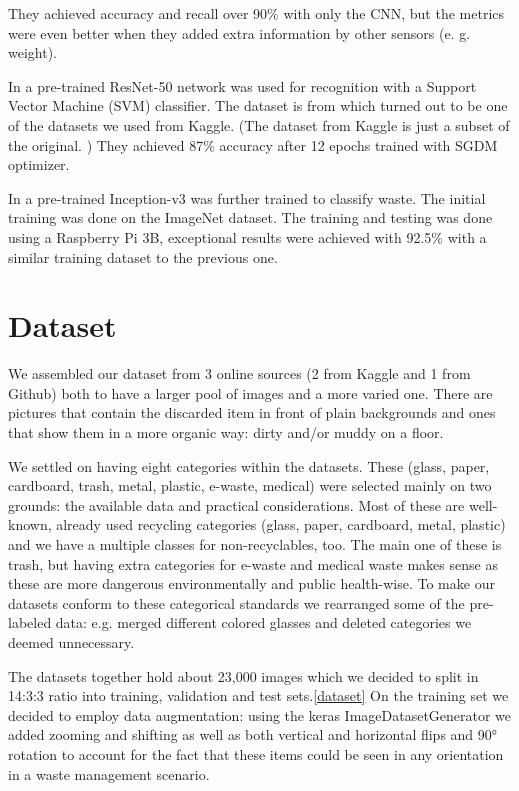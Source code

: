 \documentclass[twocolumn]{article}
\begin{document}
	They achieved accuracy and recall over 90\% with only the CNN, but the metrics were even better when they added extra information by other sensors (e. g. weight).
	
	In \cite{ADEDEJI2019607} a pre-trained ResNet-50 \cite{DBLP:journals/corr/HeZRS15}
	network was used for recognition with a Support Vector Machine (SVM) classifier. The dataset is from \cite{yang2016classification} which turned out to be one of the datasets we used from Kaggle. (The dataset from Kaggle is just a subset of the original. \cite{cchangcs_2018}) They achieved 87\% accuracy after 12 epochs trained with SGDM optimizer.
	
	In \cite{10.1145/3417473.3417474} a pre-trained Inception-v3 was further trained to classify waste. The initial training was done on the ImageNet \cite{5206848} dataset. The training and testing was done using a Raspberry Pi 3B, exceptional results were achieved with 92.5\% with a similar training dataset to the previous one.
	
	\section{Dataset}
	We assembled our dataset from 3 online sources (2 from Kaggle and 1 from Github) both to have a larger pool of images and a more varied one. There are pictures that contain the discarded item in front of plain backgrounds and ones that show them in a more organic way: dirty and/or muddy on a floor. 
	
	We settled on having eight categories within the datasets. These (glass, paper, cardboard, trash, metal, plastic, e-waste, medical) were selected mainly on two grounds: the available data and practical considerations. Most of these are well-known, already used recycling categories (glass, paper, cardboard, metal, plastic) and we have a multiple classes for non-recyclables, too. The main one of these is trash, but having extra categories for e-waste and medical waste makes sense as these are more dangerous environmentally and public health-wise. To make our datasets conform to these categorical standards we rearranged some of the pre-labeled data: e.g. merged different colored glasses and deleted categories we deemed unnecessary.
	
	The datasets together hold about 23,000 images which we decided to split in 14:3:3 ratio into training, validation and test sets.\ref{dataset} On the training set we decided to employ data augmentation: using the keras ImageDatasetGenerator we added zooming and shifting as well as both vertical and horizontal flips and 90° rotation to account for the fact that these items could be seen in any orientation in a waste management scenario.
	
\end{document}
